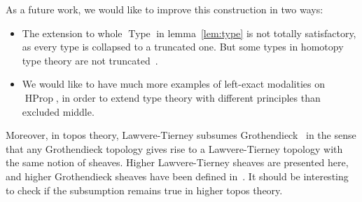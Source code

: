 \documentclass[preprint,9pt,numbers]{sigplanconf}
\newcommand{\eg}{e.g,\xspace}
\DeclareMathOperator{\Type}{Type}
\DeclareMathOperator{\HProp}{HProp}
\begin{document}
As a future work, we would like to improve this construction in two
ways:
\begin{itemize}
\item 
  The extension to whole $\Type$ in lemma~\ref{lem:type} is not
  totally satisfactory, as every type is collapsed to a truncated
  one. But some types in homotopy type theory are not
  truncated~\cite[Example 8.8.6]{hottbook}.
\item 
  We would like to have much more examples of left-exact modalities on
  $\HProp$, in order to extend type theory with different principles
  than excluded middle.
\end{itemize}
Moreover, in topos theory, Lawvere-Tierney subsumes Gro\-thendieck~\cite[Section~V.4]{maclanemoerdijk} in the sense that any
Grothen\-dieck topology gives rise to a Lawvere-Tierney topology with
the same notion of sheaves. Higher Lawvere-Tierney sheaves are
presented here, and higher Grothendieck sheaves have been defined
in~\cite{lurie}. It should be interesting to check if the subsumption
remains true in higher topos theory.







\end{document}
